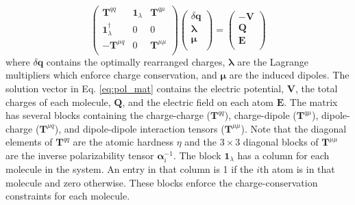 \documentclass[journal=jctcce,manuscript=article]{achemso}
\begin{document}
\begin{equation}
  \begin{pmatrix}
    \bm{T}^{qq} & \bm{1}_\lambda & \bm{T}^{q\mu} \\
    \bm{1}_\lambda^\dagger & 0 & 0 \\
    -\bm{T}^{\mu q} & 0 & \bm{T}^{\mu\mu} \\
  \end{pmatrix}
  \begin{pmatrix}
    \delta \bm{q} \\
    \bm{\lambda} \\
    \bm{\mu} \\
  \end{pmatrix}
  =
  \begin{pmatrix}
    -\bm{V} \\
    \bm{Q} \\
    \bm{E} \\
  \end{pmatrix}
  \label{eq:pol_mat}
\end{equation}
where $\delta\bm{q}$ contains the optimally rearranged charges, $\bm{\lambda}$ are
the Lagrange multipliers which enforce charge conservation, and $\bm{\mu}$ are the induced dipoles. The solution vector in Eq. \ref{eq:pol_mat} contains the electric potential,
$\bm{V}$, the total charges of each molecule, $\bm{Q}$, and the electric
field on each atom $\bm{E}$. The matrix has several blocks containing the
charge-charge ($\bm{T}^{qq}$), charge-dipole ($\bm{T}^{q\mu}$),
dipole-charge ($\bm{T}^{\mu q}$), and dipole-dipole interaction tensors ($\bm{T}^{\mu\mu}$).
Note that the diagonal elements of $\bm{T}^{qq}$ are the atomic hardness $\eta$ and
the $3\times 3$ diagonal blocks of $\bm{T}^{\mu\mu}$ are the inverse polarizability tensor
$\bm{\alpha}_i^{-1}$. The block $\bm{1}_\lambda$ has a column for each molecule in the system.
An entry in that column is 1 if the $i$th atom is in that molecule and zero otherwise.
These blocks enforce the charge-conservation constraints for each molecule.
\end{document}
